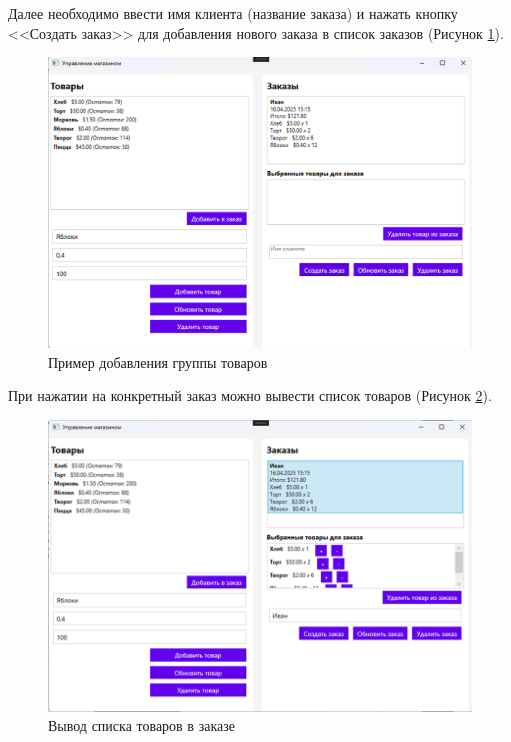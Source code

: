 \documentclass[12pt]{article}
\begin{document}
\pagebreak

Далее необходимо ввести имя клиента (название заказа) и нажать кнопку <<Создать заказ>> для добавления нового заказа в список заказов (Рисунок \ref{fig:demo5}).


\begin{figure}[ht]
	\centering
	\includegraphics[width=1.0\textwidth]{fig/image 62.png}
	\caption{Пример добавления группы товаров}
	\label{fig:demo5}
\end{figure}

\pagebreak

При нажатии на конкретный заказ можно вывести список товаров (Рисунок \ref{fig:demo6}).

\begin{figure}[ht]
	\centering
	\includegraphics[width=1.0\textwidth]{fig/image 63.png}
	\caption{Вывод списка товаров в заказе}
	\label{fig:demo6}
\end{figure}
\end{document}

